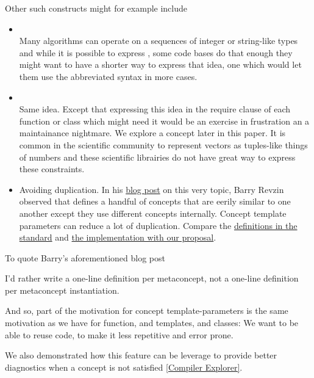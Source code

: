 \documentclass{wg21}
\begin{document}
Other such constructs might for example include
\begin{itemize}
\item {}\\
    Many algorithms can operate on a sequences of integer or string-like types and while it is possible to express
    , some code bases do that enough they might want to have a shorter way to express that idea,
    one which would let them use the abbreviated syntax in more cases.

\item {} \\
    Same idea. Except that expressing this idea in the require clause of each function or class which might need it would be an exercise in frustration an
    a maintainance nightmare. We explore a  concept later in this paper.
    It is common in the scientific community to represent vectors as tuples-like things of numbers and these scientific librairies do not have great way to express
    these constraints.

\item Avoiding duplication. In his \href{https://brevzin.github.io/c++/2019/01/09/concept-templates/}{blog post} on this very topic, Barry Revzin observed that  defines a handful of concepts that
are eerily similar to one another except they use different concepts internally. Concept template parameters can reduce a lot of duplication.
Compare the \href{https://eel.is/c++draft/indirectcallable.indirectinvocable}{definitions in the standard} and \href{https://godbolt.org/z/ohKsoKh9G}{the implementation with our proposal}.
\end{itemize}

To quote Barry's aforementioned blog post
\begin{quoteblock}
I’d rather write a one-line definition per metaconcept, not a one-line definition per metaconcept instantiation.
\end{quoteblock}

And so, part of the motivation for concept template-parameters is the same motivation as we have for function, and templates, and classes:
We want to be able to reuse code, to make it less repetitive and error prone.


We also demonstrated how this feature can be leverage to provide better diagnostics when a concept is not satisfied \href{https://compiler-explorer.com/z/sPz5faEbP}{[Compiler Explorer]}.
\end{document}
